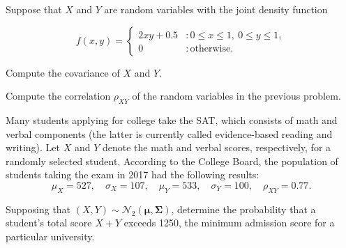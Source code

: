 \documentclass[12pt,reqno]{amsart}
\begin{document}
\vfill
\prob Suppose that $X$ and $Y$ are random variables with the joint density function

	\[
	f(x,y) = \begin{cases}
	2xy + 0.5 & : 0 \leq x\leq 1, \ 0 \leq y \leq 1, \\
	0 & : \text{otherwise}.
	\end{cases}
	\]
	
Compute the covariance of $X$ and $Y$.








\vfill
\newpage
\prob Compute the correlation $\rho_{XY}$ of the random variables in the previous problem.









\vfill
\prob Many students applying for college take the SAT, which consists of math and verbal components (the latter is currently called evidence-based reading and writing). Let $X$ and $Y$ denote the math and verbal scores, respectively, for a randomly selected student. According to the College Board, the population of students taking the exam in 2017 had the following results:
	\[\mu_X = 527, \quad \sigma_X = 107, \quad \mu_Y = 533, \quad \sigma_Y = 100, \quad \rho_{XY} = 0.77.
	\]

Supposing that $(X,Y) \sim \mathcal{N}_2(\boldsymbol\mu,\boldsymbol\Sigma)$, determine the probability that a student's total score $X+Y$ exceeds 1250, the minimum admission score for a particular university.
\vfill
\end{document}
